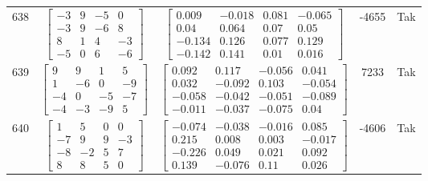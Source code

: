 \documentclass[a4paper,12pt]{article}
\begin{document}
\begin{tabular}{c c c c c}
638
&
$\begin{bmatrix} -3 & 9 & -5 & 0 \\ -3 & 9 & -6 & 8 \\ 8 & 1 & 4 & -3 \\ -5 & 0 & 6 & -6 \end{bmatrix}$
&
$\begin{bmatrix} 0.009 & -0.018 & 0.081 & -0.065 \\ 0.04 & 0.064 & 0.07 & 0.05 \\ -0.134 & 0.126 & 0.077 & 0.129 \\ -0.142 & 0.141 & 0.01 & 0.016 \end{bmatrix}$
&
-4655
&
Tak
\\
639
&
$\begin{bmatrix} 9 & 9 & 1 & 5 \\ 1 & -6 & 0 & -9 \\ -4 & 0 & -5 & -7 \\ -4 & -3 & -9 & 5 \end{bmatrix}$
&
$\begin{bmatrix} 0.092 & 0.117 & -0.056 & 0.041 \\ 0.032 & -0.092 & 0.103 & -0.054 \\ -0.058 & -0.042 & -0.051 & -0.089 \\ -0.011 & -0.037 & -0.075 & 0.04 \end{bmatrix}$
&
7233
&
Tak
\\
640
&
$\begin{bmatrix} 1 & 5 & 0 & 0 \\ -7 & 9 & 9 & -3 \\ -8 & -2 & 5 & 7 \\ 8 & 8 & 5 & 0 \end{bmatrix}$
&
$\begin{bmatrix} -0.074 & -0.038 & -0.016 & 0.085 \\ 0.215 & 0.008 & 0.003 & -0.017 \\ -0.226 & 0.049 & 0.021 & 0.092 \\ 0.139 & -0.076 & 0.11 & 0.026 \end{bmatrix}$
&
-4606
&
Tak
\\
\end{tabular} \egroup \newpage
\end{document}
